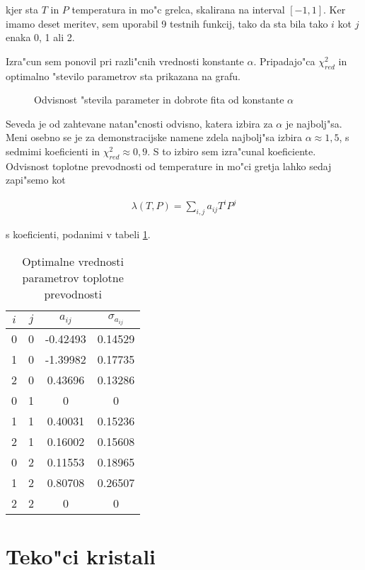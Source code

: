 \documentclass[a4paper,10pt]{article}
\begin{document}
kjer sta $T$ in $P$ temperatura in mo"c grelca, skalirana na interval $[-1,1]$. Ker imamo deset meritev, sem uporabil 9 testnih funkcij, tako da sta bila tako $i$ kot $j$ enaka 0, 1 ali 2. 

Izra"cun sem ponovil pri razli"cnih vrednosti konstante $\alpha$. Pripadajo"ca $\chi^2_{red}$ in optimalno "stevilo parametrov sta prikazana na grafu. 

\begin{figure}
 
  \caption{Odvisnost "stevila parameter in dobrote fita od konstante $\alpha$}
\label{fig:prev-a}
\end{figure}

Seveda je od zahtevane natan"cnosti odvisno, katera izbira za $\alpha$ je najbolj"sa. Meni osebno se je za demonstracijske namene zdela najbolj"sa izbira $\alpha \approx 1,5$, s sedmimi koeficienti in $\chi^2_{red} \approx 0,9$. S to izbiro sem izra"cunal koeficiente. Odvisnost toplotne prevodnosti od temperature in mo"ci gretja lahko sedaj zapi"semo kot

\begin{align}
 \lambda(T,P) = \sum_{i,j} a_{ij} T^i P^j
\end{align}

s koeficienti, podanimi v tabeli \ref{tab:prev}. 

\begin{table}[h]
 \centering
\begin{tabular}{|c|c|c|c|}
\hline
$i$ & $j$ & $a_{ij}$ & $\sigma_{a_{ij}}$ \\
\hline
0 & 0 & -0.42493 & 0.14529 \\
1 & 0 & -1.39982 & 0.17735 \\
2 & 0 & 0.43696 & 0.13286 \\
0 & 1 & 0 & 0\\
1 & 1 & 0.40031 & 0.15236 \\
2 & 1 & 0.16002 & 0.15608 \\
0 & 2 & 0.11553 & 0.18965 \\
1 & 2 & 0.80708 & 0.26507 \\
2 & 2 & 0 & 0 \\
\hline
\end{tabular}
\caption{Optimalne vrednosti parametrov toplotne prevodnosti}
\label{tab:prev}
\end{table}


\clearpage
\section{Teko"ci kristali}
\end{document}
